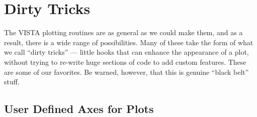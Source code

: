 %
%
%
%
%
%


%
%
%
%
%

\chapter{Dirty Tricks}

The VISTA plotting routines are as general as we could make them, and as a
result, there is a wide range of possibilities.  Many of these take the form
of what we call ``dirty tricks'' --- little hooks that can enhance the
appearance of a plot, without trying to re-write huge sections of code to add
custom features.  These are some of our favorites.  Be warned, however, that
this is genuine ``black belt'' stuff.

\section{User Defined Axes for Plots}

